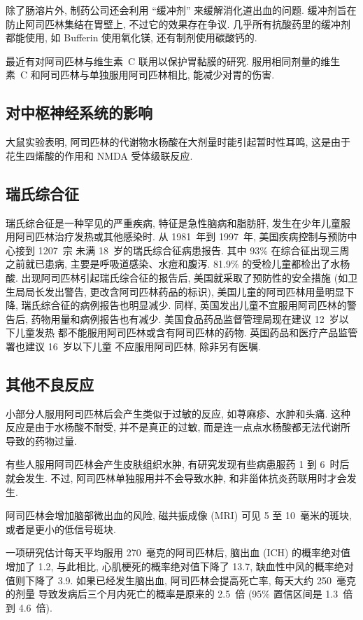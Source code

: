 除了肠溶片外,
制药公司还会利用 ``缓冲剂'' 来缓解消化道出血的问题.
缓冲剂旨在防止阿司匹林集结在胃壁上, 不过它的效果存在争议.
几乎所有抗酸药里的缓冲剂都能使用,
如 Bufferin 使用氧化镁, 还有制剂使用碳酸钙的.

最近有对阿司匹林与维生素~C 联用以保护胃黏膜的研究.
服用相同剂量的维生素~C 和阿司匹林与单独服用阿司匹林相比,
能减少对胃的伤害.

\subsection{对中枢神经系统的影响}

大鼠实验表明, 阿司匹林的代谢物水杨酸在大剂量时能引起暂时性耳鸣,
这是由于花生四烯酸的作用和 NMDA 受体级联反应.

\subsection{瑞氏综合征}

瑞氏综合征是一种罕见的严重疾病, 特征是急性脑病和脂肪肝,
发生在少年儿童服用阿司匹林治疗发热或其他感染时.
从 1981~年到 1997~年,
美国疾病控制与预防中心接到 \num{1207}~宗%
未满 18~岁的瑞氏综合征病患报告.
其中 93\% 在综合征出现三周之前就已患病,
主要是呼吸道感染、水痘和腹泻.
81.9\% 的受检儿童都检出了水杨酸.
出现阿司匹林引起瑞氏综合征的报告后,
美国就采取了预防性的安全措施
(如卫生局局长发出警告, 更改含阿司匹林药品的标识),
美国儿童的阿司匹林用量明显下降,
瑞氏综合征的病例报告也明显减少.
同样, 英国发出儿童不宜服用阿司匹林的警告后,
药物用量和病例报告也有减少.
美国食品药品监督管理局现在建议 12~岁以下儿童发热%
都不能服用阿司匹林或含有阿司匹林的药物.
英国药品和医疗产品监管署也建议 16~岁以下儿童%
不应服用阿司匹林, 除非另有医嘱.

\subsection{其他不良反应}

小部分人服用阿司匹林后会产生类似于过敏的反应,
如荨麻疹、水肿和头痛.
这种反应是由于水杨酸不耐受, 并不是真正的过敏,
而是连一点点水杨酸都无法代谢所导致的药物过量.

有些人服用阿司匹林会产生皮肤组织水肿,
有研究发现有些病患服药 1 到 6~时后就会发生.
不过, 阿司匹林单独服用并不会导致水肿,
和非甾体抗炎药联用时才会发生.

阿司匹林会增加脑部微出血的风险,
磁共振成像 (MRI) 可见 5 至 10~毫米的斑块,
或者是更小的低信号斑块.

一项研究估计每天平均服用 270~毫克的阿司匹林后,
脑出血 (ICH) 的概率绝对值增加了 1.2\textperthousand,
与此相比, 心肌梗死的概率绝对值下降了 13.7\textperthousand,
缺血性中风的概率绝对值则下降了 3.9\textperthousand.
如果已经发生脑出血, 阿司匹林会提高死亡率,
每天大约 250~毫克的剂量%
导致发病后三个月内死亡的概率是原来的 2.5~倍
(95\% 置信区间是 1.3~倍到 4.6~倍).

